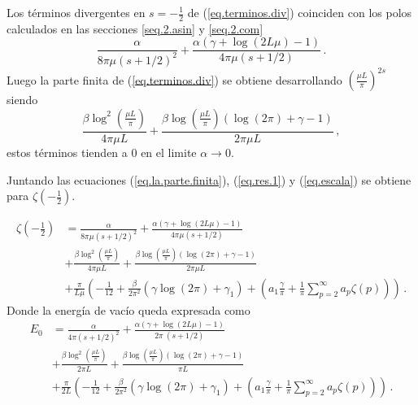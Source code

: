Los términos divergentes en $s = -\frac{1}{2} $ de (\ref{eq.terminos.div}) coinciden con los polos calculados en las secciones \ref{seq.2.asin} y \ref{seq.2.com}
\begin{equation*}
	\frac{\alpha}{8  \pi \mu (s+1/2)^2} +
    \frac{ \alpha ( \gamma  +  \log (2L \mu ) -1 ) }{4  \pi \mu (s+1/2) }
    	\, .
\end{equation*}
Luego la parte finita de (\ref{eq.terminos.div}) se obtiene desarrollando $\left(\frac{\mu L}{\pi}\right) ^{2s} $ siendo
\begin{equation}\label{eq.la.parte.finita}
\frac{\beta \log ^2 \left( \frac{\mu L}{\pi} \right)}{4 \pi \mu L}  +
\frac{
	\beta \log \left( \frac{\mu L}{\pi}\right) 
	( \log (2 \pi ) + \gamma -1)
	}{2 \pi \mu L}
\, ,
\end{equation}
estos términos tienden a $0$ en el limite $\alpha \rightarrow 0$.

Juntando las ecuaciones (\ref{eq.la.parte.finita}), (\ref{eq.res.1}) y (\ref{eq.escala}) se obtiene para $\zeta \left( - \frac{1}{2} \right)$.

\begin{align}\label{eq.zeta.final}
\nonumber
\zeta \left( - \frac{1}{2} \right) &=
		\frac{\alpha}{8  \pi \mu (s+1/2)^2}	 +
	    \frac{
	    	\alpha ( \gamma  +  \log (2L \mu ) -1 ) }
	    	{4  \pi \mu (s+1/2) } 
\\[5pt]
&
+
		\frac{\beta \log ^2 \left( \frac{\mu L}{\pi} \right)}{4 \pi \mu L}  +
		\frac{
			\beta \log \left( \frac{\mu L}{\pi}\right)
				( \log (2 \pi ) + \gamma -1)}
			{2 \pi \mu L}  
\\[5pt]
\nonumber
&
+
\frac{\pi}{L \mu}  
					\left(
							- \frac{1}{12} +
							\frac{\beta}{2 \pi ^2} \left(
														\gamma \log (2 \pi)
														+ \gamma _1
														\right) +
							\left(
								a _1 \frac{\gamma}{\pi} +
								\frac{1}{\pi} \sum _{p=2} ^{\infty}
								a_p \zeta (p) 
								\right)
							\right) 
\, .
\end{align}
Donde la energía de vacío queda expresada como
\begin{align}\label{energia.vacio.final}
\nonumber
E_ 0 &=
		\frac{\alpha}{4  \pi  (s+1/2)^2}	 +
	    \frac{
	    	\alpha ( \gamma  +  \log (2L \mu ) -1 ) }
	    	{2  \pi \ (s+1/2) } 
\\[5pt]
&
+
		\frac{\beta \log ^2 \left( \frac{\mu L}{\pi} \right)}{2 \pi  L}  +
		\frac{
			\beta \log \left( \frac{\mu L}{\pi}\right)
				( \log (2 \pi ) + \gamma -1)}
			{ \pi  L}  
\\[5pt]
\nonumber
&
+
\frac{\pi}{2 L }  
					\left(
							- \frac{1}{12} +
							\frac{\beta}{2 \pi ^2} \left(
														\gamma \log (2 \pi)
														+ \gamma _1
														\right) +
							\left(
								a _1 \frac{\gamma}{\pi} +
								\frac{1}{\pi} \sum _{p=2} ^{\infty}
								a_p \zeta (p) 
								\right)
							\right) 
\, .
\end{align}

